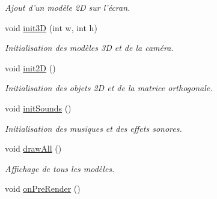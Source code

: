 \begin{DoxyCompactItemize}
\begin{DoxyCompactList}\small\item\em Ajout d'un modèle 2\+D sur l'écran. \end{DoxyCompactList}\item 
\hypertarget{classSceneManager_a85be3bf568c2050211027b9db5e0ffc2}{void \hyperlink{classSceneManager_a85be3bf568c2050211027b9db5e0ffc2}{init3\+D} (int w, int h)}\label{classSceneManager_a85be3bf568c2050211027b9db5e0ffc2}

\begin{DoxyCompactList}\small\item\em Initialisation des modèles 3\+D et de la caméra. \end{DoxyCompactList}\item 
\hypertarget{classSceneManager_af50c8abaae0774c3ded179269fb4f247}{void \hyperlink{classSceneManager_af50c8abaae0774c3ded179269fb4f247}{init2\+D} ()}\label{classSceneManager_af50c8abaae0774c3ded179269fb4f247}

\begin{DoxyCompactList}\small\item\em Initialisation des objets 2\+D et de la matrice orthogonale. \end{DoxyCompactList}\item 
\hypertarget{classSceneManager_a6c3b7f01e718505c424e97bef4bc9394}{void \hyperlink{classSceneManager_a6c3b7f01e718505c424e97bef4bc9394}{init\+Sounds} ()}\label{classSceneManager_a6c3b7f01e718505c424e97bef4bc9394}

\begin{DoxyCompactList}\small\item\em Initialisation des musiques et des effets sonores. \end{DoxyCompactList}\item 
\hypertarget{classSceneManager_ae95a2a4d00b37f18b924f30570619a30}{void \hyperlink{classSceneManager_ae95a2a4d00b37f18b924f30570619a30}{draw\+All} ()}\label{classSceneManager_ae95a2a4d00b37f18b924f30570619a30}

\begin{DoxyCompactList}\small\item\em Affichage de tous les modèles. \end{DoxyCompactList}\item 
\hypertarget{classSceneManager_a167d8c660828c07aa6b189e0a4c809bd}{void \hyperlink{classSceneManager_a167d8c660828c07aa6b189e0a4c809bd}{on\+Pre\+Render} ()}\label{classSceneManager_a167d8c660828c07aa6b189e0a4c809bd}


\end{DoxyCompactItemize}
